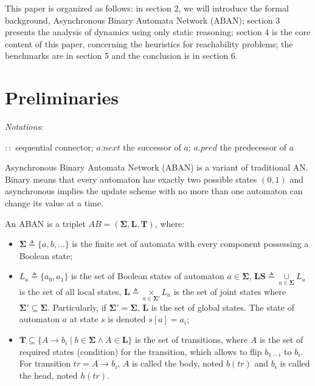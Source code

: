 \documentclass[runningheads]{llncs}
\begin{document}
This paper is organized as follows: in section 2, we will introduce the formal background, Asynchronous Binary Automata Network (ABAN); section 3 presents the analysis of dynamics using only static reasoning; 
section 4 is the core content of this paper, concerning the heuristics for reachability problems; 
the benchmarks are in section 5 and the conclusion is in section 6.
\section{Preliminaries}\label{sect:2}
\textit{Notations}:

$::$ sequential connector;
$a.next$ the successor of $a$; $a.pred$ the predecessor of $a$

Asynchronous Binary Automata Network (ABAN) is a variant of traditional AN.
Binary means that every automaton has exactly two possible states $(0,1)$ and asynchronous implies the update scheme with no more than one automaton can change its value at a time. 

\begin{definition}[ABAN]
An ABAN is a triplet $AB = (\mathbf{\Sigma},\mathbf{L},\mathbf{T})$, where:
\begin{itemize}
\item $\mathbf{\Sigma}\triangleq\{a,b,\ldots\}$ is the finite set of automata with every component possessing a Boolean state;
\item $L_a\triangleq\{a_0,a_1\}$ is the set of Boolean states of automaton $a\in \mathbf{\Sigma}$, $\mathbf{LS}\triangleq \underset{a\in \mathbf{\Sigma}}{\cup} L_a$ is the set of all local states,  $\mathbf{L}\triangleq \underset{a\in \mathbf{\Sigma'}}{\times} L_a$ is the set of joint states where $\mathbf{\Sigma'}\subseteq\mathbf{\Sigma}$. Particularly, if $\mathbf{\Sigma'}=\mathbf{\Sigma}$, $\mathbf{L}$ is the set of global states. 
The state of automaton $a$ at state $s$ is denoted $s[a]=a_i$;
\item $\mathbf{T}\subseteq \{A\to b_{i}\mid b\in \mathbf{\Sigma} \land A\in \mathbf{L}\}$ is the set of transitions, where $A$ is the set of required states (condition) for the transition, which allows to flip $b_{1-i}$ to $b_i$. 
For transition $tr=A\to b_{i}$, $A$ is called the body, noted $b(tr)$ and $b_i$ is called the head, noted $h(tr)$.
\end{itemize}
\end{definition}
\end{document}
